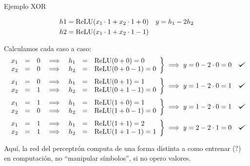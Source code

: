 \begin{example}
Ejemplo XOR


\begin{align*}
    h1 &= \operatorname{ReLU}({x}_1 \cdot 1 + {x}_2 \cdot 1 + 0) & y &= {h}_1 - 2 {h}_2\\
    h2 &= \operatorname{ReLU}({x}_1 \cdot 1 + {x}_2 \cdot 1 - 1) &  &
\end{align*}

Calculamos cada caso a caso:
\begin{equation*}
\left.
\begin{array}{rclcrcl}
    {x}_1 &=& 0 &\implies& {h}_1 &=& \relu (0+0) = 0 \\
    {x}_2 &=& 0 &\implies& {h}_2 &=& \relu (0+0 - 1) = 0
\end{array}
\right\} \implies y = 0 - 2 \cdot 0 = 0 \quad \checkmark
\end{equation*}
\begin{equation*}
\left.
\begin{array}{rclcrcl}
    {x}_1 &=& 0 &\implies& {h}_1 &=& \relu (0 + 1)     = 1 \\
    {x}_2 &=& 1 &\implies& {h}_2 &=& \relu (0 + 1 - 1) = 0
\end{array}
\right\} \implies y = 1 - 2 \cdot 0 = 1 \quad \checkmark
\end{equation*}
\begin{equation*}
\left.
\begin{array}{rclcrcl}
    {x}_1 &=& 1 &\implies& {h}_1 &=& \relu (1 + 0)     = 1 \\
    {x}_2 &=& 0 &\implies& {h}_2 &=& \relu (1 + 0 - 1) = 0
\end{array}
\right\} \implies y = 1 - 2 \cdot 0 = 1 \quad \checkmark
\end{equation*}
\begin{equation*}
\left.
\begin{array}{rclcrcl}
    {x}_1 &=& 1 &\implies& {h}_1 &=& \relu (1 + 1)     = 2 \\
    {x}_2 &=& 1 &\implies& {h}_2 &=& \relu (1 + 1 - 1) = 1
\end{array}
\right\} \implies y = 2 - 2 \cdot 1 = 0 \quad \checkmark
\end{equation*}

Aquí, la red del perceptrón computa de una forma distinta a como entrenar (?) en computación, no ``manipular símbolos'', si no opero valores.


\end{example}
